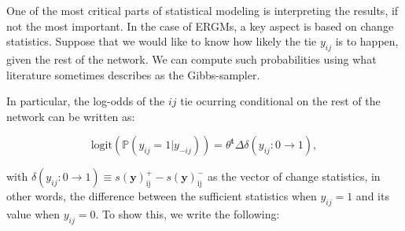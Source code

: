 \documentclass[
]{book}
\begin{document}
One of the most critical parts of statistical modeling is interpreting the results,
if not the most important. In the case of ERGMs, a key aspect is based on change
statistics. Suppose that we would like to know how likely the tie \(y_{ij}\) is to
happen, given the rest of the network. We can compute such probabilities using what
literature sometimes describes as the Gibbs-sampler.

In particular, the log-odds of the \(ij\) tie ocurring conditional on the rest of
the network can be written as:

\newcommand{\sufstats}[1]{s\left(#1\right)}
\renewcommand{\exp}[1]{\mbox{exp}\left\{#1\right\}}
\renewcommand{\log}[1]{\mbox{log}\left\{#1\right\}}
\newcommand{\transpose}[1]{{#1}^\mathbf{t}}
\renewcommand{\t}[1]{\transpose{#1}}

\newcommand{\s}[1]{\sufstats{#1}}
\newcommand{\SUFF}{\mathcal{S}}
\newcommand{\Suff}{\mathbf{S}}
\newcommand{\suff}{\mathbf{s}}

\newcommand{\isone}[1]{{\boldsymbol{1}\left( #1 \right)}}
\renewcommand{\Pr}[1]{{\mathbb{P}\left(#1\right) }}
\newcommand{\f}[1]{{f\left(#1\right) }}
\newcommand{\Prcond}[2]{{\mathbb{P}\left(#1\vphantom{#2}\;\right|\left.\vphantom{#1}#2\right)}}
\newcommand{\fcond}[2]{{f\left(#1|#2\right) }}
\newcommand{\Expected}[1]{{\mathbb{E}\left\{#1\right\}}}
\newcommand{\ExpectedCond}[2]{{\mathbb{E}\left\{#1\vphantom{#2}\right|\left.\vphantom{#1}#2\right\}}}
\renewcommand{\exp}[1]{\mbox{exp}\left\{#1\right\}}

\newcommand{\Likelihood}[2]{\text{L}\left(#1 \left|\vphantom{#1}#2\right.\right)}

\newcommand{\loglik}[1]{l\left(#1\right)}
\newcommand{\logit}[1]{\mbox{logit}\left(#1\right)}
\newcommand{\chng}[1]{\delta\left(y_{#1}:0\to1\right)}

\newcommand{\pgraph}{\mathbf{x}}
\newcommand{\snamed}[2]{\s{#1}_{\mbox{#2}}}

\begin{equation}
    \mbox{logit}\left({\mathbb{P}\left(y_{ij} = 1|y_{-ij}\right) }\right) = {\theta}^\mathbf{t}\Delta\delta\left(y_{ij}:0\to 1\right),
\end{equation}

\noindent with \(\delta\left(y_{ij}:0\to 1\right)\equiv s\left(\mathbf{y}\right)_{\mbox{ij}}^+ - s\left(\mathbf{y}\right)_{\mbox{ij}}^-\) as
the vector of change statistics, in other words, the difference between the
sufficient statistics when \(y_{ij}=1\) and its value when \(y_{ij} = 0\). To show
this, we write the following:
\end{document}
